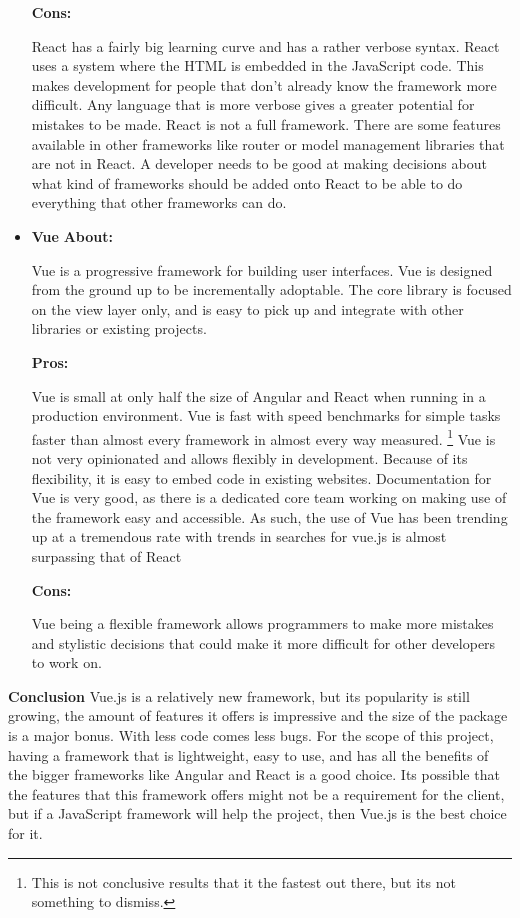 \documentclass[draftclsnofoot,onecolumn,letterpaper,10pt]{IEEEtran}
\begin{document}
\begin{itemize}
				\noindent \textbf{Cons:}

				React has a fairly big learning curve and has a rather verbose syntax.
				React uses a system where the HTML is embedded in the JavaScript code.
				This makes development for people that don't already know the framework more difficult.
				Any language that is more verbose gives a greater potential for mistakes to be made.
				React is not a full framework.
				There are some features available in other frameworks like router or model management libraries that are not in React.
				A developer needs to be good at making decisions about what kind of frameworks should be added onto React to be able to do everything that other frameworks can do.


			\item{\textbf{Vue}}
				\textbf{About:}

				Vue is a progressive framework for building user interfaces.
				Vue is designed from the ground up to be incrementally adoptable.
				The core library is focused on the view layer only, and is easy to pick up and integrate with other libraries or existing projects.


				\textbf{Pros:}

				Vue is small at only half the size of Angular and React when running in a production environment.
				Vue is fast with speed benchmarks for simple tasks faster than almost every framework in almost every way measured.
				\footnote{This is not conclusive results that it the fastest out there, but its not something to dismiss.\cite{SpeedReport}}
				Vue is not very opinionated and allows flexibly in development.\cite{Vue}
				Because of its flexibility, it is easy to embed code in existing websites.
				Documentation for Vue is very good, as there is a dedicated core team working on making use of the framework easy and accessible.
				As such, the use of Vue has been trending up at a tremendous rate with trends in searches for vue.js is almost surpassing that of React\cite{vueVSreactSearches}

				\textbf{Cons:}

				Vue being a flexible framework allows programmers to make more mistakes and stylistic decisions that could make it more difficult for other developers to work on.

		\end{itemize}

	\textbf{Conclusion}
		Vue.js is a relatively new framework, but its popularity is still growing, the amount of features it offers is impressive and the size of the package is a major bonus.
		With less code comes less bugs.
		For the scope of this project, having a framework that is lightweight, easy to use, and has all the benefits of the bigger frameworks like Angular and React is a good choice.
		Its possible that the features that this framework offers might not be a requirement for the client, but if a JavaScript framework will help the project, then Vue.js is the best choice for it.\\
\end{document}
